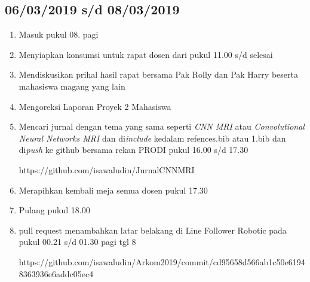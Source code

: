 \subsection{06/03/2019 s/d 08/03/2019}
\begin{enumerate}
  \item Masuk pukul 08. pagi
  \item Menyiapkan konsumsi untuk rapat dosen dari pukul 11.00 s/d selesai
  \item Mendiskusikan prihal hasil rapat bersama Pak Rolly dan Pak Harry beserta mahasiswa magang yang lain
  \item Mengoreksi Laporan Proyek 2 Mahasiswa
  \item Mencari jurnal dengan tema yang sama seperti \textit{CNN MRI} atau \textit{Convolutional Neural Networks MRI} dan di\textit{include} kedalam refences.bib atau 1.bib dan di\textit{push} ke github bersama rekan PRODI pukul 16.00 s/d 17.30
  \par https://github.com/isawaludin/JurnalCNNMRI
  \item Merapihkan kembali meja semua dosen pukul 17.30
  \item Pulang pukul 18.00
  \item pull request menambahkan latar belakang di Line Follower Robotic pada pukul 00.21 s/d 01.30 pagi tgl 8
  \par https://github.com/isawaludin/Arkom2019/commit/cd95658d566ab1c50e61948363936e6addc05ec4
\end{enumerate} 